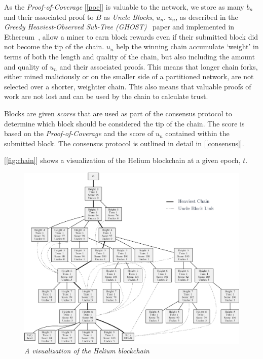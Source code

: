 \documentclass[UTF8, 10pt, nonatbib, nocopyrightspace, reprint]{sigplanconf}
\newcommand{\secref}[1]{[\autoref{#1}]}
\newcommand{\figref}[1]{[\autoref{#1}]}
\begin{document}
As the \emph{Proof-of-Coverage} \secref{poc} is valuable to the network, we store as many $b_n$ and their associated proof to $B$ as \emph{Uncle Blocks}, $u_n$. $u_n$, as described in the \emph{Greedy Heaviest-Observed Sub-Tree (GHOST)}~\cite{ghost} paper and implemented in Ethereum~\cite{ethereum}, allow a miner to earn block rewards even if their submitted block did not become the tip of the chain. $u_n$ help the winning chain accumulate `weight' in terms of both the length and quality of the chain, but also including the amount and quality of $u_n$ and their associated proofs. This means that longer chain forks, either mined maliciously or on the smaller side of a partitioned network, are not selected over a shorter, weightier chain. This also means that valuable proofs of work are not lost and can be used by the chain to calculate trust.

Blocks are given \emph{scores} that are used as part of the consensus protocol to determine which block should be considered the tip of the chain. The score is based on the \emph{Proof-of-Coverage} and the score of $u_n$ contained within the submitted block. The consensus protocol is outlined in detail in \secref{consensus}.

\figref{fig:chain} shows a visualization of the Helium blockchain at a given epoch, $t$.

\begin{figure}[h]
    \begin{center}
          \includegraphics[width=\textwidth]{chain.eps}
          \caption{\emph{A visualization of the Helium blockchain}}
          \label{fig:chain}
     \end{center}
\end{figure}
\end{document}
